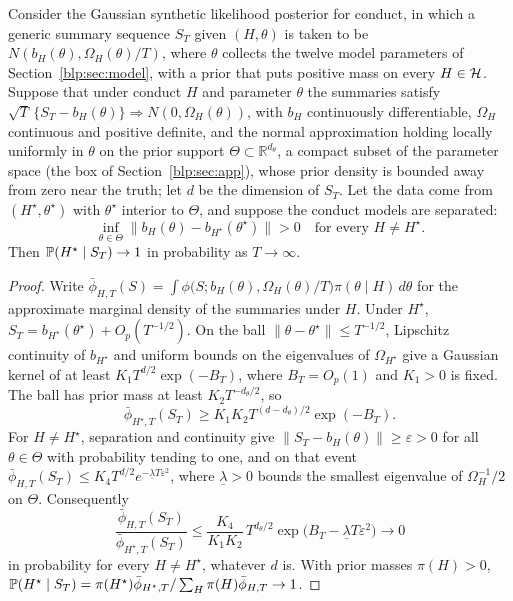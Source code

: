 \begin{proposition}\label{blp:prop:consistency}
Consider the Gaussian synthetic likelihood posterior for conduct, in which a generic summary sequence $S_T$ given $(H,\theta)$ is
taken to be $N(b_H(\theta),\Omega_H(\theta)/T)$, where $\theta$ collects the twelve model parameters of Section~\ref{blp:sec:model}, with a prior that puts positive mass on every
$H\in\mathcal{H}$. Suppose that under conduct $H$ and parameter $\theta$ the summaries satisfy
$\sqrt T\,\{S_T - b_H(\theta)\}\Rightarrow N(0,\Omega_H(\theta))$, with $b_H$ continuously differentiable,
$\Omega_H$ continuous and positive definite, and the normal approximation holding locally
uniformly in $\theta$ on the prior support $\Theta\subset\mathbb R^{d_\theta}$, a compact subset of the parameter space (the box of Section~\ref{blp:sec:app}), whose prior
density is bounded away from zero near the truth; let $d$ be the dimension of $S_T$. Let the data come from
$(H^\star,\theta^\star)$ with $\theta^\star$ interior to $\Theta$, and suppose the conduct models
are separated:
\[
\inf_{\theta\in\Theta}\lVert b_H(\theta) - b_{H^\star}(\theta^\star)\rVert > 0\quad\text{for every }H\neq H^\star .
\]
Then $\mathbb{P}(H^\star\mid S_T)\to 1$ in probability as $T\to\infty$.
\end{proposition}
\begin{proof}
Write $\bar\phi_{H,T}(S) = \int\phi\bigl(S;b_H(\theta),\Omega_H(\theta)/T\bigr)\pi(\theta\mid H)\,d\theta$
for the approximate marginal density of the summaries under $H$. Under $H^\star$,
$S_T=b_{H^\star}(\theta^\star)+O_p(T^{-1/2})$. On the ball $\lVert\theta-\theta^\star\rVert\le T^{-1/2}$, Lipschitz continuity of $b_{H^\star}$ and uniform bounds on the eigenvalues of $\Omega_{H^\star}$ give a Gaussian kernel of at least $K_1T^{d/2}\exp(-B_T)$, where $B_T=O_p(1)$ and $K_1>0$ is fixed. The ball has prior mass at least $K_2T^{-d_\theta/2}$, so
\[
\bar\phi_{H^\star,T}(S_T)\ge K_1K_2T^{(d-d_\theta)/2}\exp(-B_T).
\]
For $H\neq H^\star$, separation and continuity give $\lVert S_T - b_H(\theta)\rVert\ge\varepsilon>0$ for all $\theta\in\Theta$ with probability tending to one, and on that event $\bar\phi_{H,T}(S_T)\le K_4T^{d/2}e^{-\underline\lambda T\varepsilon^2}$, where $\underline\lambda>0$ bounds the smallest eigenvalue of $\Omega_H^{-1}/2$ on $\Theta$. Consequently
\[
\frac{\bar\phi_{H,T}(S_T)}{\bar\phi_{H^\star,T}(S_T)}\le\frac{K_4}{K_1K_2}\,T^{d_\theta/2}\exp\bigl(B_T-\underline\lambda T\varepsilon^2\bigr)\to 0
\]
in probability for every $H\neq H^\star$, whatever $d$ is. With prior masses $\pi(H)>0$,
$\mathbb{P}(H^\star\mid S_T) = \pi(H^\star)\bar\phi_{H^\star,T}/\sum_H \pi(H)\bar\phi_{H,T}\to 1$.
\end{proof}

